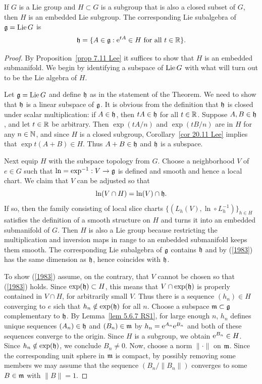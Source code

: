 \begin{thm}\label{thm closed subgroup}
    If $G$ is a Lie group and $H\subset G$ is a subgroup that is also a closed subset of $G$, then $H$ is an embedded Lie subgroup. The corresponding Lie subalgebra of $\mathfrak{g}=\operatorname{Lie} G$ is 
    \[\mathfrak{h}=\{A\in\mathfrak{g}: \mathrm{e}^{tA}\in H \text{ for all }t\in\mathbb{R}\}.\]
\end{thm}
\begin{proof}
    By Proposition~\ref{prop 7.11 Lee} it suffices to show that $H$ is an embedded submanifold. We begin by identifying a subspace of $\operatorname{Lie} G$ with what will turn out to be the Lie algebra of $H$.

    Let $\mathfrak{g}=\operatorname{Lie} G$ and define $\mathfrak{h}$ as in the statement of the Theorem. We need to show that $\mathfrak{h}$ is a linear subspace of $\mathfrak{g}$. It is obvious from the definition that $\mathfrak{h}$ is closed under scalar multiplication: if $A\in\mathfrak{h}$, then $tA\in\mathfrak{h}$ for all $t\in \mathbb{R}$. Suppose $A,B\in\mathfrak{h}$, and let $t \in\mathbb{R}$ be arbitrary. Then $\exp(tA/n)$ and $\exp(tB/n)$ are in $H$ for any $n\in \mathbb{N}$, and since $H$ is a closed subgroup, Corollary~\ref{cor 20.11 Lee} implies that $\exp t(A+B)\in H$. Thus $A+B\in\mathfrak{h}$ and $\mathfrak{h}$ is a subspace.

    Next equip $H$ with the subspace topology from $G$. Choose a neighborhood $V$ of $e\in G$ such that $\ln=\exp^{-1}:V\to \mathfrak{g}$ is defined and smooth and hence a local chart. We claim that $V$ can be adjusted so that 
    \[\ln(V\cap H)=\ln(V)\cap \mathfrak{h}.\label{1983}\]
    If so, then the family consisting of local slice charts $\{(L_h(V),\ln\circ L_{h}^{-1})\}_{h\in H}$ satisfies the definition of a smooth structure on $H$ and turns it into an embedded submanifold of $G$. Then $H$ is also a Lie group because restricting the multiplication and inversion maps in range to an embedded submanifold keeps them smooth. The corresponding Lie subalgebra of $\mathfrak{g}$ contains $\mathfrak{h}$ and by (\ref{1983}) has the same dimension as $\mathfrak{h}$, hence coincides with $\mathfrak{h}$.

    To show (\ref{1983}) assume, on the contrary, that $V$ cannot be chosen so that (\ref{1983}) holds. Since $\exp(\mathfrak{h})\subset H$, this means that $V\cap \exp(\mathfrak{h})$ is properly contained in $V\cap H$, for arbitrarily small $V$. Thus there is a sequence $(h_n)\in H$ converging to $e$ sich that $h_n\notin \exp(\mathfrak{h})$ for all $n$. Choose a subspace $\mathfrak{m}\subset\mathfrak{g}$ complementary to $\mathfrak{h}$. By Lemma~\ref{lem 5.6.7 RS1}, for large enough $n$, $h_n$ defines unique sequences $(A_n)\in \mathfrak{h}$ and $(B_n)\in \mathfrak{m}$ by $h_n=\mathrm{e}^{A_n}\mathrm{e}^{B_n}$ and both of these sequences converge to the origin. Since $H$ is a subgroup, we obtain $\mathrm{e}^{B_n}\in H$. Since $h_n\notin\exp(\mathfrak{h})$, we conclude $B_n\neq 0$. Now, choose a norm $\lVert\cdot\rVert$ on $\mathfrak{m}$. Since the corresponding unit sphere in $\mathfrak{m}$ is compact, by possibly removing some members we may assume that the sequence $(B_n/\lVert B_n\rVert)$ converges to some $B\in\mathfrak{m}$ with $\lVert B\rVert=1$. 
    

\end{proof}
